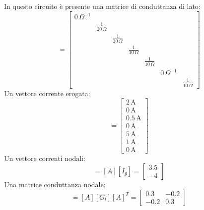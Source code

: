 \documentclass{article}
\newcommand{\SI}[1]{\mathrm{#1}}
\numberwithin{equation}{subsection}
\begin{document}
In questo circuito è presente una matrice di conduttanza di lato:
\begin{equation*}
    [G_l]=\begin{bmatrix}
        0\,\Omega^{-1}&&&&&&\\
        &\displaystyle\frac{1}{20\,\Omega}&&&&&\\
        &&\displaystyle\frac{1}{20\,\Omega}&&&&\\
        &&&\displaystyle\frac{1}{10\,\Omega}&&&\\
        &&&&\displaystyle\frac{1}{10\,\Omega}&&\\
        &&&&&0\,\Omega^{-1}&\\
        &&&&&&\displaystyle\frac{1}{10\,\Omega}
    \end{bmatrix}
\end{equation*}
Un vettore corrente erogata:
\begin{equation*}
    [I_g]=\begin{bmatrix}
        2\,\SI{A}\\
        0\,\SI{A}\\
        0.5\,\SI{A}\\
        0\,\SI{A}\\
        5\,\SI{A}\\
        1\,\SI{A}\\
        0\,\SI{A}
    \end{bmatrix}
\end{equation*}
Un vettore correnti nodali:
\begin{equation*}
    [I_\mathrm{no}]=[A][I_g]=\begin{bmatrix}
        3.5\\
        -4
    \end{bmatrix}
\end{equation*}
Una matrice conduttanza nodale:
\begin{equation*}
    [G_\mathrm{no}]=[A][G_l][A]^T=\begin{bmatrix}
        0.3&-0.2\\
        -0.2&0.3
    \end{bmatrix}
\end{equation*}
\end{document}
